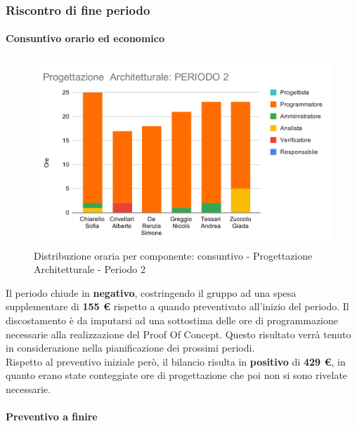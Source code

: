 \subsubsection{Riscontro di fine periodo}


\paragraph{Consuntivo orario ed economico}
\subparagraph*{}

\contabilitaTable{
	
}

\begin{figure}[H]
	\centering
	\includegraphics[scale=2]{res/images/charts/consuntivo/prog_arch_2.png}
	\caption{Distribuzione oraria per componente: consuntivo - Progettazione Architetturale - Periodo 2}
\end{figure}


Il periodo chiude in \textbf{negativo}, costringendo il gruppo ad una spesa supplementare di \textbf{155 \euro} rispetto a quando preventivato all'inizio del periodo. Il discostamento è da imputarsi ad una sottostima delle ore di programmazione necessarie alla realizzazione del Proof Of Concept. Questo risultato verrà tenuto in considerazione nella pianificazione dei prossimi periodi. \\
Rispetto al preventivo iniziale però, il bilancio risulta in \textbf{positivo} di \textbf{429 \euro}, in quanto erano state conteggiate ore di progettazione che poi non si sono rivelate necessarie.


\paragraph{Preventivo a finire}
\subparagraph*{}

